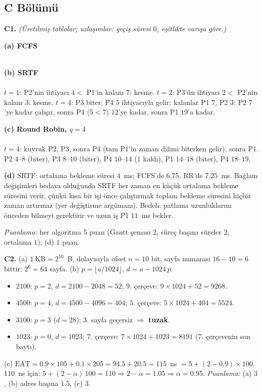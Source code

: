 \subsection*{C Bölümü}
\textbf{C1.} \textit{(Üretilmiş tablolar; uzlaşımlar: geçiş süresi $0$, eşitlikte varışa göre.)}

\textbf{(a) FCFS}\\[0.2em]
\\[0.3em]
{\small{}}

\textbf{(b) SRTF}\\[0.2em]
\\[0.3em]
$t=1$: P2'nin ihtiyacı $4 <$ P1'in kalanı $7$: kesme. $t=2$: P3'ün ihtiyacı $2 <$ P2'nin kalanı $3$: kesme. $t=4$: P3 biter; P4 $5$ ihtiyacıyla gelir; kalanlar P1 $7$, P2 $3$: P2 $7$'ye kadar çalışır, sonra P4 ($5 < 7$) $12$'ye kadar, sonra P1 $19$'a kadar.\\
{\small{}}

\textbf{(c) Round Robin, $q = 4$}\\[0.2em]
\\[0.3em]
$t=4$: kuyruk P2, P3, sonra P4 (tam P1'in zaman dilimi biterken gelir), sonra P1. P2 $4$--$8$ (biter), P3 $8$--$10$ (biter), P4 $10$--$14$ ($1$ kaldı), P1 $14$--$18$ (biter), P4 $18$--$19$.\\
{\small{}}

\textbf{(d)} SRTF: ortalama bekleme süresi $4$~ms; FCFS'de $6.75$, RR'de $7.25$~ms. Bağlam değişimleri bedava olduğunda SRTF her zaman en küçük ortalama bekleme süresini verir, çünkü kısa bir işi önce çalıştırmak toplam bekleme süresini hiçbir zaman artırmaz (yer değiştirme argümanı). Bedeli: patlama uzunluklarını önceden bilmeyi gerektirir ve uzun iş P1 $11$~ms bekler.

\textit{Puanlama:} her algoritma $5$ puan (Gantt şeması $2$, süreç başına süreler $2$, ortalama $1$); (d) $1$ puan.

\textbf{C2.} (a) $1\ \text{KB} = 2^{10}$~B, dolayısıyla ofset $n = 10$ bit, sayfa numarası $16 - 10 = 6$ bittir: $2^{6} = 64$ sayfa.
(b) $p = \lfloor a/1024 \rfloor$, $d = a - 1024\,p$:
\begin{itemize}
  \item $2100$: $p = 2$, $d = 2100 - 2048 = 52$; $9$. çerçeve: $9 \times 1024 + 52 = 9268$.
  \item $4500$: $p = 4$, $d = 4500 - 4096 = 404$; $5$. çerçeve: $5 \times 1024 + 404 = 5524$.
  \item $3100$: $p = 3$ ($d = 28$): $3$. sayfa geçersiz $\Rightarrow$ \textbf{tuzak}.
  \item $1023$: $p = 0$, $d = 1023$; $7$. çerçeve: $7 \times 1024 + 1023 = 8191$ ($7$. çerçevenin son baytı).
\end{itemize}
(c) $\text{EAT} = 0.9 \times 105 + 0.1 \times 205 = 94.5 + 20.5 = 115$~ns $= 5 + (2 - 0.9)\times100$. $110$~ns için: $5 + (2-\alpha)\,100 = 110 \Rightarrow 2 - \alpha = 1.05 \Rightarrow \alpha = 0.95$.
\textit{Puanlama:} (a) $3$, (b) adres başına $1.5$, (c) $3$.

